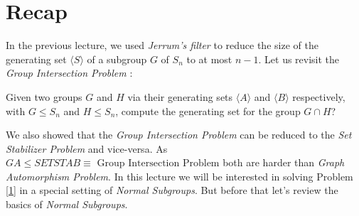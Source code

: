 
\section{Recap}
In the previous lecture, we used \emph{Jerrum's filter} to reduce the size of the generating set $\langle S\rangle$ of a subgroup $G$ of $S_n$ to at most $n-1$. Let us revisit the \emph{Group Intersection Problem} :
\begin{problem}\label{1}
	Given two groups $G$ and $H$ via their generating sets $\langle A\rangle$ and $\langle B\rangle$ respectively, with $G\leq S_n$ and $H\leq S_n$, compute the generating set for the group $G\cap H$?
\end{problem}
We also showed that the \emph{Group Intersection Problem} can be reduced to the \emph{Set Stabilizer Problem} and vice-versa. As $GA\leq SETSTAB \equiv\text{ Group Intersection Problem}$ both are harder than \emph{Graph Automorphism Problem}. In this lecture we will be interested in solving Problem \ref{1} in a special setting of \emph{Normal Subgroups}. But before that let's review the basics of \emph{Normal Subgroups}.

